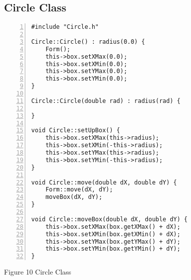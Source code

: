 \documentclass{llncs}
\begin{document}
\subsection{Circle Class}
\begin{lstlisting}[basicstyle=\footnotesize\ttfamily, numbers=left, stepnumber=1, numberstyle = \normalsize]
#include "Circle.h"

Circle::Circle() : radius(0.0) {
	Form();
	this->box.setXMax(0.0);
	this->box.setXMin(0.0);
	this->box.setYMax(0.0);
	this->box.setYMin(0.0);
}

Circle::Circle(double rad) : radius(rad) {

}

void Circle::setUpBox() {
	this->box.setXMax(this->radius);
	this->box.setXMin(-this->radius);
	this->box.setYMax(this->radius);
	this->box.setYMin(-this->radius);
}

void Circle::move(double dX, double dY) {
	Form::move(dX, dY);
	moveBox(dX, dY);
}

void Circle::moveBox(double dX, double dY) {
	this->box.setXMax(box.getXMax() + dX);
	this->box.setXMin(box.getXMin() + dX);
	this->box.setYMax(box.getYMax() + dY);
	this->box.setYMin(box.getYMin() + dY);
}

\end{lstlisting}
\scriptsize{Figure 10 Circle Class}\newline
\newline
\newline


\end{document}
